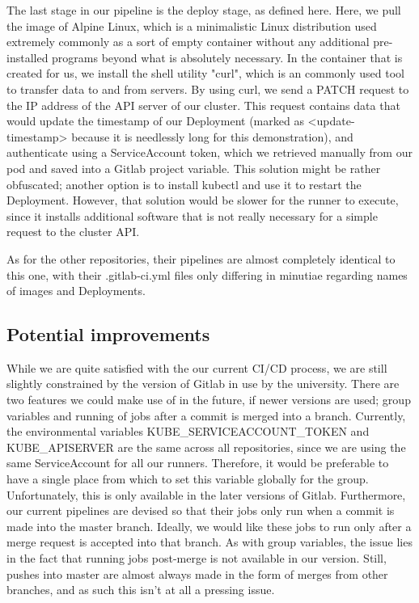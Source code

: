 \documentclass[thesis=B,english]{FITthesis}[2019/12/23]
\begin{document}
The last stage in our pipeline is the deploy stage, as defined here. Here, we pull the image of Alpine Linux, which is a minimalistic Linux distribution used extremely commonly as a sort of empty container without any additional pre-installed programs beyond what is absolutely necessary. In the container that is created for us, we install the shell utility "curl", which is an commonly used tool to transfer data to and from servers. By using curl, we send a PATCH request to the IP address of the API server of our cluster. This request contains data that would update the timestamp of our Deployment (marked as <update-timestamp> because it is needlessly long for this demonstration), and authenticate using a ServiceAccount token, which we retrieved manually from our pod and saved into a Gitlab project variable. This solution might be rather obfuscated; another option is to install kubectl and use it to restart the Deployment. However, that solution would be slower for the runner to execute, since it installs additional software that is not really necessary for a simple request to the cluster API.

As for the other repositories, their pipelines are almost completely identical to this one, with their .gitlab-ci.yml files only differing in minutiae regarding names of images and Deployments. 

\subsection{Potential improvements}

While we are quite satisfied with the our current CI/CD process, we are still slightly constrained by the version of Gitlab in use by the university. There are two features we could make use of in the future, if newer versions are used; group variables and running of jobs after a commit is merged into a branch. Currently, the environmental variables KUBE\_SERVICEACCOUNT\_TOKEN and KUBE\_APISERVER are  the same across all repositories, since we are using the same ServiceAccount for all our runners. Therefore, it would be preferable to have a single place from which to set this variable globally for the group. Unfortunately, this is only available in the later versions of Gitlab. Furthermore, our current pipelines are devised so that their jobs only run when a commit is made into the master branch. Ideally, we would like these jobs to run only after a merge request is accepted into that branch. As with group variables, the issue lies in the fact that running jobs post-merge is not available in our version. Still, pushes into master are almost always made in the form of merges from other branches, and as such this isn't at all a pressing issue.
\end{document}
